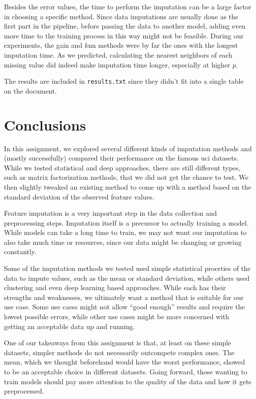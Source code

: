 \documentclass[12pt]{article}
\begin{document}
Besides the error values, the time to perform the imputation can be a large factor
in choosing a specific method.
Since data imputations are usually done as the first part in the pipeline, 
before passing the data to another model, adding even more time to the 
training process in this way might not be feasible.
During our experiments, the gain and $k$nn methods were by far the ones
with the longest imputation time.
As we predicted, calculating the nearest neighbors of each missing value
did indeed make imputation time longer, especially at higher $p$.

The results are included in \texttt{results.txt} since they didn't fit into a single table
on the document.

\section{Conclusions}
In this assignment, we explored several different kinds of imputation methods and (mostly 
successfully) compared their performance on the famous uci datasets.
While we tested statistical and deep approaches, there are still different 
types, such as matrix factorization methods, that we did not get the 
chance to test.
We then slightly tweaked an existing method to come up with a method
based on the standard deviation of the observed feature values.

Feature imputation is a very important step in the data collection and
preprocessing steps.
Imputation itself is a precursor to actually training a model.
While models can take a long time to train, we may not want our 
imputation to also take much time or resources, since our data might
be changing or growing constantly.

Some of the imputation methods we tested used simple statistical proerties
of the data to impute values, such as  the mean or standard deviation, 
while others used clustering and even deep learning based approaches.
While each has their strengths and weaknesses, we ultimately want
a method that is suitable for our use case.
Some use caess might not allow ``good enough'' results and require
the lowest possible errors, while other use cases might be more 
concerned with getting an acceptable data up and running.

One of our takeaways from this assignment is that, at least on these
simple datasets, simpler methods do not necessarily outcompete 
complex ones.
The mean, which we thought beforehand would have the worst performance,
showed to be an acceptable choice in different datasets.
Going forward, those wanting to train models should pay more attention
to the quality of the data and how it gets preprocessed.
\end{document}
